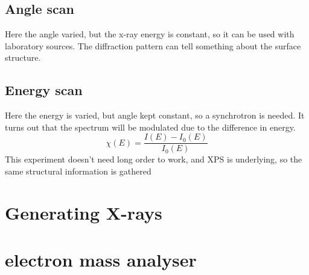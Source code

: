 \documentclass[article,oneside]{memoir}
\begin{document}
\section{Angle scan}
Here the angle varied, but the x-ray energy is constant, so it can be used with laboratory sources. The diffraction pattern can tell something about the surface structure.

\section{Energy scan}
Here the energy is varied, but angle kept constant, so a synchrotron is needed. It turns out that the spectrum will be modulated due to the difference in energy.
\begin{equation*}
        \chi(E)= \frac{I(E)-I_{0}(E)}{I_{0}(E)}
\end{equation*}
This experiment doesn't need long order to work, and XPS is underlying, so the same structural information is gathered

\chapter{Generating X-rays}


\chapter{electron mass analyser}
\end{document}
